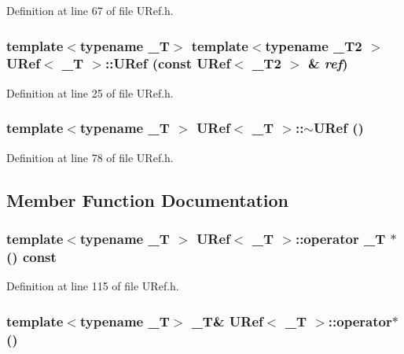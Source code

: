Definition at line 67 of file URef.h.\hypertarget{class_u_ref_da86fb36f9910e52dfb81ce3c19d31c1}{
\subsubsection[{URef}]{\setlength{\rightskip}{0pt plus 5cm}template$<$typename \_\-T$>$ template$<$typename \_\-T2 $>$ {\bf URef}$<$ \_\-T $>$::{\bf URef} (const {\bf URef}$<$ \_\-T2 $>$ \& {\em ref})}}
\label{class_u_ref_da86fb36f9910e52dfb81ce3c19d31c1}




Definition at line 25 of file URef.h.\hypertarget{class_u_ref_b36e5b2d9fa86ccf28bc5e939ee7dd90}{
\subsubsection[{$\sim$URef}]{\setlength{\rightskip}{0pt plus 5cm}template$<$typename \_\-T $>$ {\bf URef}$<$ \_\-T $>$::$\sim${\bf URef} ()}}
\label{class_u_ref_b36e5b2d9fa86ccf28bc5e939ee7dd90}




Definition at line 78 of file URef.h.

\subsection{Member Function Documentation}
\hypertarget{class_u_ref_31f31cd4531e3c101eb3abe46d3c436a}{
\subsubsection[{operator \_\-T $\ast$}]{\setlength{\rightskip}{0pt plus 5cm}template$<$typename \_\-T $>$ {\bf URef}$<$ \_\-T $>$::operator \_\-T $\ast$ () const}}
\label{class_u_ref_31f31cd4531e3c101eb3abe46d3c436a}




Definition at line 115 of file URef.h.\hypertarget{class_u_ref_7a7e59bd3b36450974ba87512d0af445}{
\subsubsection[{operator$\ast$}]{\setlength{\rightskip}{0pt plus 5cm}template$<$typename \_\-T$>$ \_\-T\& {\bf URef}$<$ \_\-T $>$::operator$\ast$ ()}}
\label{class_u_ref_7a7e59bd3b36450974ba87512d0af445}




